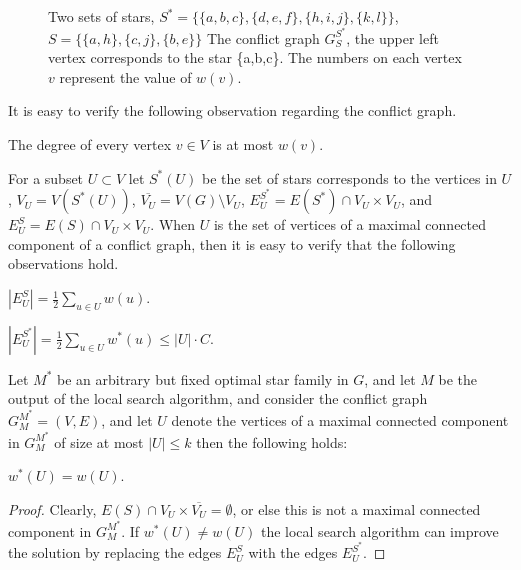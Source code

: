 \begin{figure}[h]
\centering
\subfloat[]{
\label{subfloat:graph}

}
\subfloat[]{
\label{subfloat:conflict}

}
\caption[]{
\label{fig:conflict}
Two sets of stars, 
$S^* = \{\{a,b,c\}, \{d,e,f\}, \{h,i,j\}, \{k,l\}\}$, 
$S = \{\{a,h\}, \{c,j\}, \{b,e\}\}$ 
The conflict graph $G^{S^*}_{S}$, the upper left vertex corresponds 
to the star \{a,b,c\}.
The numbers on each vertex $v$ represent the value of $w(v)$.
}
\end{figure}

It is easy to verify the following observation regarding the conflict graph.

\begin{observation}  
The degree of every vertex $v \in V$ is at most $w(v)$.
\end{observation}

For a subset $U \subset V$ let $S^*(U)$ be the set of stars corresponds to 
the vertices in $U$,
$V_U = V(S^*(U))$,
$\overline{V_U} = V(G) \setminus V_U$,
$E^{S^*}_U = E(S^*) \cap V_U \times V_U$,
and 
$E^{S}_U = E(S) \cap V_U \times V_U$.
When $U$ is the set of vertices of a maximal connected component of a conflict graph,
then it is easy to verify that the following observations hold.

\begin{observation}  
$|E^{S}_U| = \frac{1}{2} \sum_{u \in U} w(u)$.
\end{observation}

\begin{observation}  
$|E^{S^*}_U| = \frac{1}{2} \sum_{u \in U} w^*(u) \leq |U| \cdot C$.
\end{observation}

Let $M^*$ be an arbitrary but fixed optimal star family in $G$, 
and let $M$ be the output of the local search algorithm,  
and consider the conflict graph $G^{M^*}_M = (V,E)$,
and let $U$ denote the vertices of a maximal connected component in $G^{M^*}_M$
of size at most $|U| \leq k$ then the following holds:
 
\begin{observation}
$w^*(U) = w(U)$.
\end{observation}

\begin{proof}
Clearly, $E(S) \cap  V_U \times \overline{V_U} = \emptyset$,
or else this is not a maximal connected component in $G^{M^*}_M$.
If $w^*(U) \neq w(U)$ 
the local search algorithm can improve the solution by
replacing the edges $E^{S}_U$ with the edges $E^{S^*}_U$. 
\end{proof}

